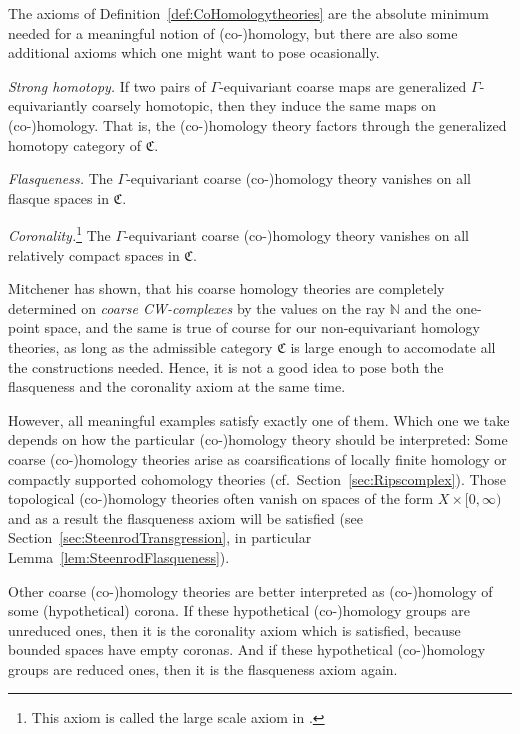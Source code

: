 \documentclass[pdftex]{sigma}
\numberwithin{equation}{section}
\theoremstyle{definition}
\newcommand{\N}{\mathbb{N}}
\newcommand{\admissible}{{\mathfrak{C}}}
\begin{document}
The axioms of Definition~\ref{def:CoHomologytheories} are the absolute minimum needed for a meaningful notion of \mbox{(co-)}homology, but there are also some additional axioms which one might want to pose ocasionally.

\medskip\noindent
{\it Strong homotopy.} If two pairs of $\Gamma$-equivariant coarse maps are generalized $\Gamma$-equivariantly coarsely homotopic, then they induce the same maps on \mbox{(co-)}ho\-mo\-lo\-gy. That is, the \mbox{(co-)}ho\-mo\-logy theory factors through the generalized homotopy category of $\admissible$.

\medskip\noindent
{\it Flasqueness.} The $\Gamma$-equivariant coarse \mbox{(co-)}homology theory vanishes on all flasque spaces in $\admissible$.

\medskip\noindent
{\it Coronality.}\footnote{This axiom is called the large scale axiom in \cite[Definition 3.1]{MitchenerCoarse}.} The $\Gamma$-equivariant coarse \mbox{(co-)}homology theory vanishes on all relatively compact spaces in $\admissible$.



Mitchener has shown, that his coarse homology theories are completely determined on \emph{coarse CW-complexes} by the values on the ray $\N$ and the one-point space, and the same is true of course for our non-equivariant homology theories, as long as the admissible category $\admissible$ is large enough to accomodate all the constructions needed. Hence, it is not a good idea to pose both the flasqueness and the coronality axiom at the same time.

However, all meaningful examples satisfy exactly one of them. Which one we take depends on how the particular \mbox{(co-)}homology theory should be interpreted:
Some coarse \mbox{(co-)}homology theories arise as coarsifications of locally finite homology or compactly supported cohomology theories (cf.\ Section~\ref{sec:Ripscomplex}). Those topological \mbox{(co-)}homology theories often vanish on spaces of the form $X\times[0,\infty)$ and as a result the flasqueness axiom will be satisfied (see Section~\ref{sec:SteenrodTransgression}, in particular Lemma~\ref{lem:SteenrodFlasqueness}).

Other coarse \mbox{(co-)}homology theories are better interpreted as \mbox{(co-)}ho\-mo\-lo\-gy of some (hypothetical) corona. If these hypothetical \mbox{(co-)}homology groups are unreduced ones, then it is the coronality axiom which is satisfied, because bounded spaces have empty coronas. And if these hypothetical \mbox{(co-)}homology groups are reduced ones, then it is the flasqueness axiom again.
\end{document}
